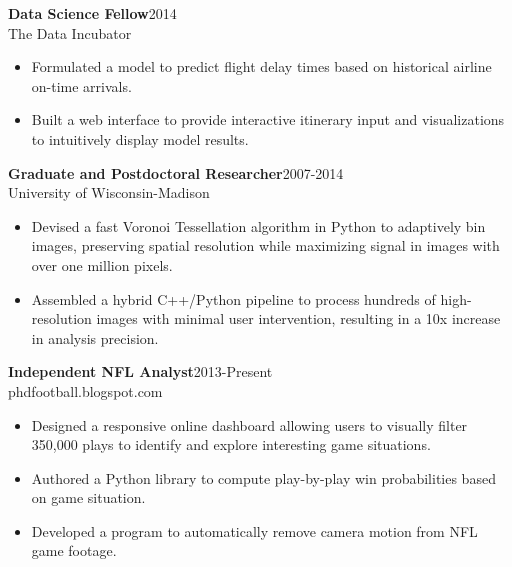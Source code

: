 \documentclass[11pt]{res}
\begin{document}
\begin{resume}
{\bf Data Science Fellow}\hfill\mbox{2014}\\
The Data Incubator
                  \vspace* {0.01 in}\begin{itemize} \itemsep -2pt
                    \item Formulated a model to predict flight
                      delay times based on
                      historical airline on-time arrivals.
                    \item Built a web interface to provide interactive itinerary
                      input and visualizations to intuitively
                      display model results.
                    \end{itemize}
\vspace{-0.15in}

{\bf Graduate and Postdoctoral Researcher}\hfill\mbox{2007-2014}\\
University of Wisconsin-Madison
                  \vspace* {0.01 in}\begin{itemize} \itemsep -2pt
                    \item Devised a fast Voronoi Tessellation
                      algorithm in Python
                      to adaptively bin images, preserving spatial
                      resolution while maximizing signal in images
                      with over one million pixels.
                   \item Assembled a hybrid C++/Python
                     pipeline to process hundreds of high-resolution images with
                     minimal user intervention, resulting in a 10x increase in analysis precision.
                  \end{itemize} 
\vspace{-0.15in}
{\bf Independent NFL Analyst}\hfill\mbox{2013-Present}\\
phdfootball.blogspot.com
                  \vspace* {0.01 in}\begin{itemize} \itemsep -2pt
                    \item Designed a responsive online dashboard
                      allowing users to visually filter 350,000
                      plays to identify and explore
                      interesting game situations.
                    \item Authored a Python library to compute
                      play-by-play win probabilities based on game situation.
                    \item Developed a program to automatically remove
                      camera motion from NFL game footage. 
                  \end{itemize} 
\vspace{-0.1in}

\end{resume}
\end{document}
